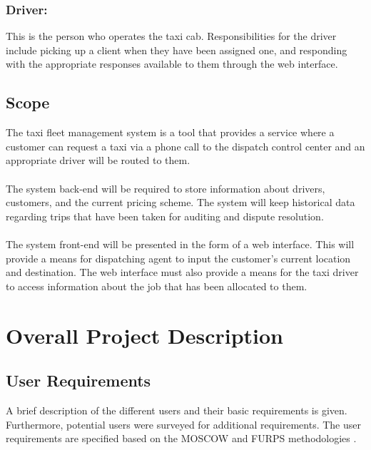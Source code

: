 \documentclass[10pt,twocolumn]{witseiepaper}
\begin{document}
\subsubsection{Driver:}
This is the person who operates the taxi cab. Responsibilities for the driver include picking up a client when they have been assigned one, and responding with the appropriate responses available to them through the web interface.

\subsection{Scope}

The taxi fleet management system is a tool that provides a service where a customer can request a taxi via a phone call to the dispatch control center and an appropriate driver will be routed to them.\\\\
The system back-end will be required to store information about drivers, customers, and the current pricing scheme. The system will keep historical data regarding trips that have been taken for auditing and dispute resolution.\\\\
The system front-end will be presented in the form of a web interface. This will provide a means for dispatching agent to input the customer's current location and destination. The web interface must also provide a means for the taxi driver to access information about the job that has been allocated to them.

\section{Overall Project Description}

\subsection{User Requirements}
A brief description of the different users and their basic requirements is given. Furthermore, potential users were surveyed for additional requirements. The user requirements are specified based on the MOSCOW and FURPS methodologies \cite{SoftwareEngTextbook}.
\end{document}
